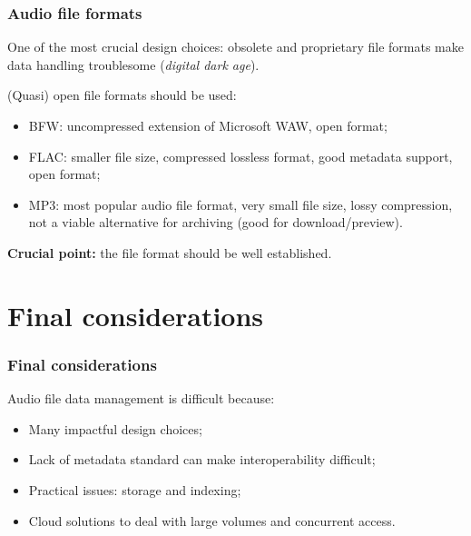 \documentclass{beamer}
\newcommand\rb[1]{\textcolor{ThemeRed}{\textbf{#1}}}
\begin{document}
  

  \begin{frame}
    \frametitle{Audio file formats}
    
    One of the most crucial design choices: obsolete and proprietary file formats make data handling troublesome (\textit{digital dark age}).

    \vspace{1em}

    (Quasi) open file formats should be used:

    \vspace{0.5em}

    \begin{itemize}
      \itemsep0.5em
      \item BFW: uncompressed extension of Microsoft WAW, open format;
      \item FLAC: smaller file size, compressed lossless format, good metadata support, open format;
      \item MP3: most popular audio file format, very small file size, lossy compression, not a viable alternative for archiving (good for download/preview).
    \end{itemize}

    \vspace{1em}

    \rb{Crucial point:} the file format should be well established.

  \end{frame}

  

\section{Final considerations}

  \begin{frame}
    \frametitle{Final considerations}
    
    Audio file data management is difficult because:
    
    \vspace{1em}
    
    \begin{itemize}
      \itemsep1em
      \item Many impactful design choices;
      \item Lack of metadata standard can make interoperability difficult;
      \item Practical issues: storage and indexing;
      \item Cloud solutions to deal with large volumes and concurrent access.
    \end{itemize}

  \end{frame}


  
  \backupbegin
  \backupend
\end{document}
